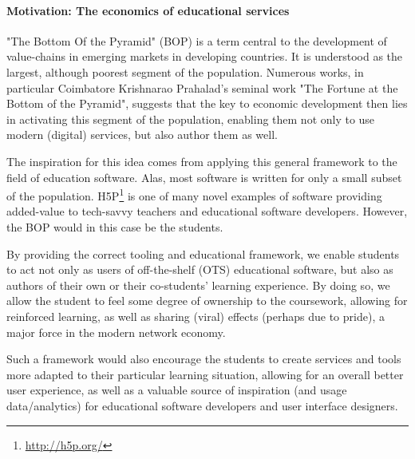 \paragraph{Motivation: The economics of educational services}

"The Bottom Of the Pyramid" (BOP) is a term central to the development of
value-chains in emerging markets in developing countries. It is understood as
the largest, although poorest segment of the population. Numerous works, in
particular Coimbatore Krishnarao Prahalad's seminal work "The Fortune at the
Bottom of the Pyramid", suggests that the key to economic development then lies
in activating this segment of the population, enabling them not only to use
modern (digital) services, but also author them as 
well\cite{prahalad2009fortune}.

The inspiration for this idea comes from applying this general framework to the
field of education software. Alas, most software is written for only a small
subset of the population. H5P\footnote{\url{http://h5p.org/}} is one of many 
novel examples of software providing added-value to tech-savvy teachers and 
educational software developers. However, the BOP would in this case be the 
students.

By providing the correct tooling and educational framework, we enable students
to act not only as users of off-the-shelf (OTS) educational software, but
also as authors of their own or their co-students' learning experience. By
doing so, we allow the student to feel some degree of ownership to the
coursework, allowing for reinforced learning, as well as sharing (viral) effects
(perhaps due to pride), a major force in the modern network economy.

Such a framework would also encourage the students to create services and tools
more adapted to their particular learning situation, allowing for an overall
better user experience, as well as a valuable source of inspiration (and usage
data/analytics) for educational software developers and user interface
designers.
